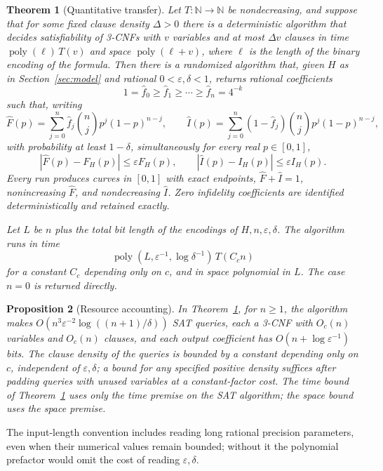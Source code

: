 \documentclass[11pt]{article}
\newtheorem{theorem}{Theorem}
\newtheorem{proposition}[theorem]{Proposition}
\theoremstyle{remark}
\newcommand{\poly}{\operatorname{poly}}
\newcommand{\eps}{\varepsilon}
\newcommand{\Bern}[2]{\binom{#1}{#2}p^{#2}(1-p)^{#1-#2}}
\begin{document}
\begin{theorem}[Quantitative transfer]\label{thm:main}
Let \(T\colon\mathbb N\to\mathbb N\) be nondecreasing, and suppose that
for some fixed clause density \(\Delta>0\) there is a deterministic algorithm
that decides satisfiability of 3-CNFs with \(v\) variables and at most
\(\Delta v\) clauses in time \(\poly(\ell)\,T(v)\) and space \(\poly(\ell+v)\),
where \(\ell\) is the length of the binary encoding of the formula.
Then there is a randomized algorithm that, given \(H\) as in
Section~\ref{sec:model} and rational \(0<\eps,\delta<1\), returns
rational coefficients
\[
 1=\widehat f_0\ge\widehat f_1\ge\cdots\ge
 \widehat f_n=4^{-k}
\]
such that, writing
\[
 \widehat F(p)=\sum_{j=0}^n\widehat f_j\Bern{n}{j},
 \qquad
 \widehat I(p)=\sum_{j=0}^n(1-\widehat f_j)\Bern{n}{j},
\]
with probability at least \(1-\delta\), simultaneously for every real
\(p\in[0,1]\),
\begin{equation}\label{eq:guarantee}
 |\widehat F(p)-F_H(p)|\le\eps F_H(p),\qquad
 |\widehat I(p)-I_H(p)|\le\eps I_H(p).
\end{equation}
Every run produces curves in \([0,1]\) with exact endpoints,
\(\widehat F+\widehat I=1\), nonincreasing \(\widehat F\), and
nondecreasing \(\widehat I\). Zero infidelity coefficients are identified
deterministically and retained exactly.

Let \(L\) be \(n\) plus the total bit length of the encodings of
\(H,n,\eps,\delta\). The algorithm runs in time
\[
 \poly(L,\eps^{-1},\log\delta^{-1})\,T(C_cn)
\]
for a constant \(C_c\) depending only on \(c\), and in space polynomial
in \(L\). The case \(n=0\) is returned directly.
\end{theorem}

\begin{proposition}[Resource accounting]\label{prop:resources}
In Theorem~\ref{thm:main}, for \(n\ge1\), the algorithm makes
\(O(n^3\eps^{-2}\log((n+1)/\delta))\) SAT queries, each a 3-CNF with
\(O_c(n)\) variables and \(O_c(n)\) clauses, and each output coefficient
has \(O(n+\log\eps^{-1})\) bits. The clause density of the queries is
bounded by a constant depending only on \(c\), independent of
\(\eps,\delta\); a bound for any specified positive density suffices
after padding queries with unused variables at a constant-factor cost.
The time bound of Theorem~\ref{thm:main} uses only the time premise on
the SAT algorithm; the space bound uses the space premise.
\end{proposition}

The input-length convention includes reading long rational precision
parameters, even when their numerical values remain bounded; without it
the polynomial prefactor would omit the cost of reading \(\eps,\delta\).
\end{document}
